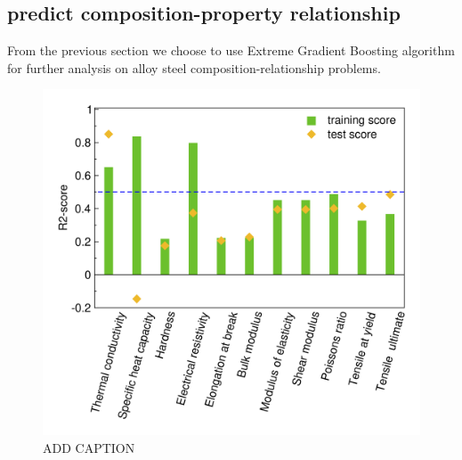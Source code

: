 \documentclass[10pt,aps,prb,amsmath,amssymb,twocolumn,letterpaper,nobalancelastpage,final,citeautoscript,floatfix,raggedbottom,superscriptaddress]{revtex4-1}
\begin{document}
\subsection{predict composition-property relationship}

From the previous section we choose to use Extreme Gradient Boosting algorithm for further analysis on alloy steel composition-relationship problems.

\begin{figure}[h]
  \center
  \vspace{-1mm}
 \includegraphics[width=0.95\linewidth]{figures/compo-prop.png}
  \caption{ADD CAPTION}
  \label{fig:compo-prop}
\end{figure}
\end{document}
